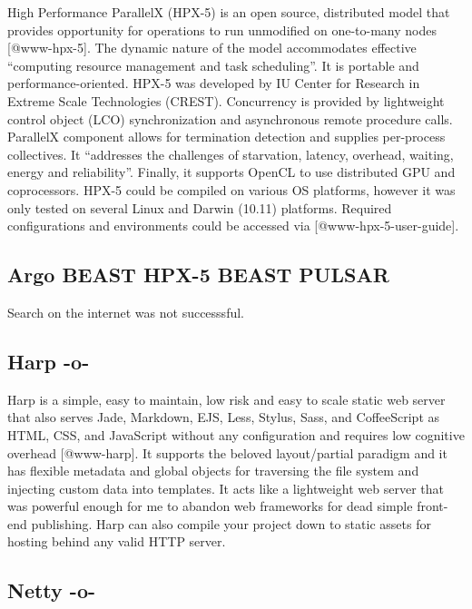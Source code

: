High Performance ParallelX (HPX-5) is an open source, distributed
model that provides opportunity for operations to run unmodified on
one-to-many nodes [@www-hpx-5].  The dynamic nature of the model
accommodates effective ``computing resource management and task
scheduling''. It is portable and performance-oriented. HPX-5 was
developed by IU Center for Research in Extreme Scale Technologies
(CREST). Concurrency is provided by lightweight control object (LCO)
synchronization and asynchronous remote procedure calls. ParallelX
component allows for termination detection and supplies per-process
collectives. It ``addresses the challenges of starvation, latency,
overhead, waiting, energy and reliability''. Finally, it supports
OpenCL to use distributed GPU and coprocessors. HPX-5 could be
compiled on various OS platforms, however it was only tested on
several Linux and Darwin (10.11) platforms. Required configurations
and environments could be accessed via [@www-hpx-5-user-guide].


   
   
\subsection{Argo BEAST HPX-5 BEAST PULSAR}

     Search on the internet was not successsful.
     
\subsection{Harp -o-}

Harp is a simple, easy to maintain, low risk and easy to scale static
web server that also serves Jade, Markdown, EJS, Less, Stylus, Sass,
and CoffeeScript as HTML, CSS, and JavaScript without any
configuration and requires low cognitive overhead [@www-harp]. It
supports the beloved layout/partial paradigm and it has flexible
metadata and global objects for traversing the file system and
injecting custom data into templates. It acts like a lightweight web
server that was powerful enough for me to abandon web frameworks for
dead simple front-end publishing. Harp can also compile your project
down to static assets for hosting behind any valid HTTP server.


     
\subsection{Netty -o-}

